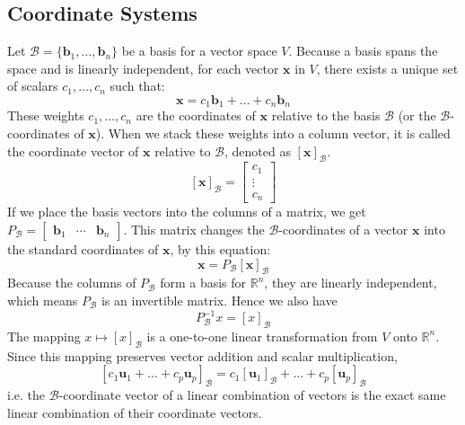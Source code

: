 \documentclass[../linear-algebra.tex]{subfiles}
\begin{document}
\subsection{Coordinate Systems}
Let $\mathcal{B} = \{\mathbf{b}_{1}, \dots, \mathbf{b}_{n}\}$ be a basis for a vector space $V$.
Because a basis spans the space and is linearly independent, for each vector $\mathbf{x}$ in $V$, there exists a unique set of scalars $c_{1}, \dots, c_{n}$ such that:
$$\mathbf{x} = c_{1}\mathbf{b}_{1} + \dots + c_{n}\mathbf{b}_{n}$$
These weights $c_{1}, \dots, c_{n}$ are the coordinates of $\mathbf{x}$ relative to the basis $\mathcal{B}$ (or the $\mathcal{B}$-coordinates of $\mathbf{x}$).\newline
When we stack these weights into a column vector, it is called the coordinate vector of $\mathbf{x}$ relative to $\mathcal{B}$, denoted as $[\mathbf{x}]_{\mathcal{B}}$.
$$[\mathbf{x}]_{\mathcal{B}} = \begin{bmatrix} c_{1} \\ \vdots \\ c_{n} \end{bmatrix}$$
If we place the basis vectors into the columns of a matrix, we get $P_{\mathcal{B}} = \begin{bmatrix} \mathbf{b}_{1} & \cdots & \mathbf{b}_{n} \end{bmatrix}$.
This matrix changes the $\mathcal{B}$-coordinates of a vector $\mathbf{x}$ into the standard coordinates of $\mathbf{x}$, by this equation:
$$\mathbf{x} = P_{\mathcal{B}}[\mathbf{x}]_{\mathcal{B}}$$
Because the columns of $P_{\mathcal{B}}$ form a basis for $\mathbb{R}^{n}$, they are linearly independent, which means $P_{\mathcal{B}}$ is an invertible matrix. Hence we also have
$$P_{\mathcal{B}}^{-1}x = [x]_{\mathcal{B}}$$
The mapping $x \mapsto [x]_{\mathcal{B}}$ is a one-to-one linear transformation from $V$ onto $\mathbb{R}^n$.\newline
Since this mapping preserves vector addition and scalar multiplication,
$$[c_{1}\mathbf{u}_{1} + \dots + c_{p}\mathbf{u}_{p}]_{\mathcal{B}} = c_{1}[\mathbf{u}_{1}]_{\mathcal{B}} + \dots + c_{p}[\mathbf{u}_{p}]_{\mathcal{B}}$$
i.e. the $\mathcal{B}$-coordinate vector of a linear combination of vectors is the exact same linear combination of their coordinate vectors.
\end{document}
